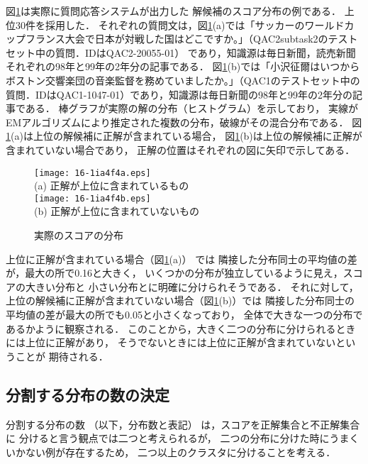 \documentclass[japanese]{jnlp_1.4}
\begin{document}
図\ref{fig:RealScore}は実際に質問応答システムが出力した
解候補のスコア分布の例である．
上位30件を採用した．
それぞれの質問文は，図\ref{fig:RealScore}(a)では「サッカーのワールドカップフランス大会で日本が対戦した国はどこですか。」（QAC2subtask2のテストセット中の質問．IDはQAC2-20055-01）
であり，知識源は毎日新聞，読売新聞それぞれの98年と99年の2年分の記事である．
図\ref{fig:RealScore}(b)では「小沢征爾はいつからボストン交響楽団の音楽監督を務めていましたか。」（QAC1のテストセット中の質問．IDはQAC1-1047-01）であり，知識源は毎日新聞の98年と99年の2年分の記事である．
棒グラフが実際の解の分布（ヒストグラム）を示しており，
実線がEMアルゴリズムにより推定された複数の分布，破線がその混合分布である．
図\ref{fig:RealScore}(a)は上位の解候補に正解が含まれている場合，
図\ref{fig:RealScore}(b)は上位の解候補に正解が含まれていない場合であり，
正解の位置はそれぞれの図に矢印で示してある．

\begin{figure}[t]
\small
\begin{center}
\texttt{[image: 16-1ia4f4a.eps]}\\
 (a) 正解が上位に含まれているもの \\[1\baselineskip]
\texttt{[image: 16-1ia4f4b.eps]} \\
 (b) 正解が上位に含まれていないもの \\
\end{center}
\caption{実際のスコアの分布}
\label{fig:RealScore}
\vspace{-0.5\baselineskip}
\end{figure}


上位に正解が含まれている場合（図\ref{fig:RealScore}(a)）
では
隣接した分布同士の平均値の差が，最大の所で0.16と大きく，
いくつかの分布が独立しているように見え，スコアの大きい分布と
小さい分布とに明確に分けられそうである．
それに対して，
上位の解候補に正解が含まれていない場合（図\ref{fig:RealScore}(b)）では
隣接した分布同士の平均値の差が最大の所でも0.05と小さくなっており，
全体で大きな一つの分布であるかように観察される．
このことから，大きく二つの分布に分けられるときには上位に正解があり，
そうでないときには上位に正解が含まれていないということが
期待される．


\subsection{分割する分布の数の決定}\label{sec:分布数判定}


分割する分布の数
（以下，分布数と表記）
は，スコアを正解集合と不正解集合に
分けると言う観点では二つと考えられるが，
二つの分布に分けた時にうまくいかない例が存在するため，
二つ以上のクラスタに分けることを考える．
\end{document}
